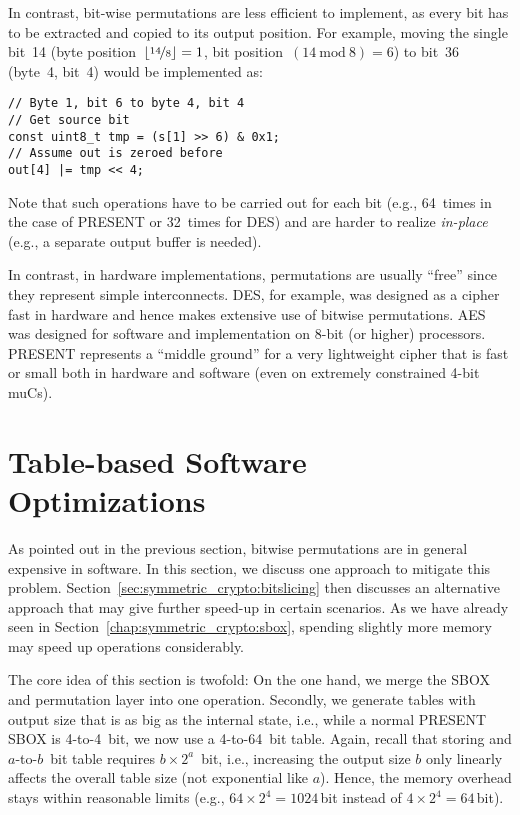 In contrast, bit-wise permutations are less efficient to implement, as every bit has to be extracted and copied to its output position. For example, moving the single bit~14 (byte position~$\left\lfloor \nicefrac{14}{8} \right\rfloor = 1$, bit position~$\left(14\ \textrm{mod}\ 8\right) = 6$) to bit~36 (byte~4, bit~4) would be implemented as:

\lstset{language=C}
\begin{lstlisting}
// Byte 1, bit 6 to byte 4, bit 4
// Get source bit
const uint8_t tmp = (s[1] >> 6) & 0x1; 
// Assume out is zeroed before
out[4] |= tmp << 4;
\end{lstlisting}

Note that such operations have to be carried out for each bit (e.g., 64~times in the case of PRESENT or 32~times for \ac{DES}) and are harder to realize \emph{in-place} (e.g., a separate output buffer is needed).

In contrast, in hardware implementations, permutations are usually ``free'' since they represent simple interconnects. \ac{DES}, for example, was designed as a cipher fast in hardware and hence makes extensive use of bitwise permutations. \ac{AES} was designed for software and implementation on 8-bit (or higher) processors. PRESENT represents a ``middle ground'' for a very lightweight cipher that is fast or small both in hardware and software (even on extremely constrained 4-bit \acp{muC}).

\section{Table-based Software Optimizations}
As pointed out in the previous section, bitwise permutations are in general expensive in software. In this section, we discuss one approach to mitigate this problem. Section~\ref{sec:symmetric_crypto:bitslicing} then discusses an alternative approach that may give further speed-up in certain scenarios. As we have already seen in Section~\ref{chap:symmetric_crypto:sbox}, spending slightly more memory may speed up operations considerably. 

The core idea of this section is twofold: On the one hand, we merge the \ac{SBOX} and permutation layer into one operation. Secondly, we generate tables with output size that is as big as the internal state, i.e., while a normal PRESENT \ac{SBOX} is 4-to-4~bit, we now use a 4-to-64~bit table. Again, recall that storing and $a$-to-$b$~bit table requires $b \times 2^a$~bit, i.e., increasing the output size $b$ only linearly affects the overall table size (not exponential like $a$). Hence, the memory overhead stays within reasonable limits (e.g., $64 \times 2^4 = 1024$\,bit instead of $4 \times 2^4 = 64$\,bit).

